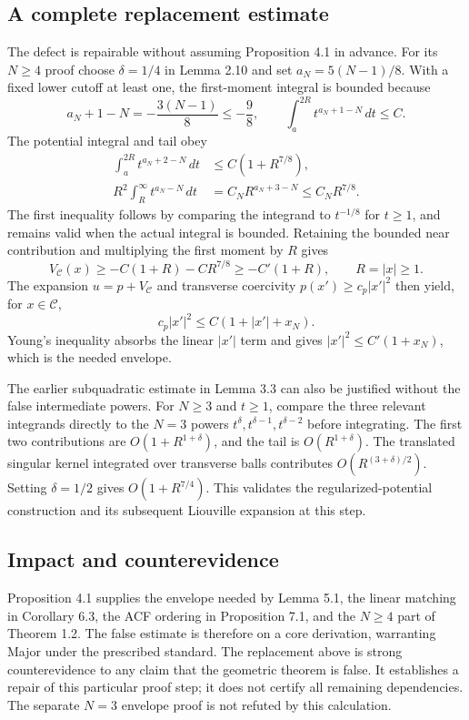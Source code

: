 \documentclass[10pt]{article}
\begin{document}
\subsection*{A complete replacement estimate}
The defect is repairable without assuming Proposition 4.1 in advance. For its \(N\geq4\) proof choose \(\delta=1/4\) in Lemma 2.10 and set \(a_N=5(N-1)/8\). With a fixed lower cutoff at least one, the first-moment integral is bounded because \[a_N+1-N=-\frac{3(N-1)}8\leq-\frac98,\qquad
\int_a^{2R}t^{a_N+1-N}\,dt\leq C.\] The potential integral and tail obey \[\begin{aligned}
\int_a^{2R}t^{a_N+2-N}\,dt
 &\leq C(1+R^{7/8}),\\
R^2\int_R^\infty t^{a_N-N}\,dt
 &= C_N R^{a_N+3-N}\leq C_N R^{7/8}.\end{aligned}\] The first inequality follows by comparing the integrand to \(t^{-1/8}\) for \(t\geq1\), and remains valid when the actual integral is bounded. Retaining the bounded near contribution and multiplying the first moment by \(R\) gives \[V_{\mathcal C}(x)\geq-C(1+R)-CR^{7/8}\geq-C'(1+R),
\qquad R=|x|\geq1.\] The expansion \(u=p+V_{\mathcal C}\) and transverse coercivity \(p(x')\geq c_p|x'|^2\) then yield, for \(x\in\mathcal C\), \[c_p|x'|^2\leq C(1+|x'|+x_N).\] Young’s inequality absorbs the linear \(|x'|\) term and gives \(|x'|^2\leq C'(1+x_N)\), which is the needed envelope.\par
The earlier subquadratic estimate in Lemma 3.3 can also be justified without the false intermediate powers. For \(N\geq3\) and \(t\geq1\), compare the three relevant integrands directly to the \(N=3\) powers \(t^\delta,t^{\delta-1},t^{\delta-2}\) before integrating. The first two contributions are \(O(1+R^{1+\delta})\), and the tail is \(O(R^{1+\delta})\). The translated singular kernel integrated over transverse balls contributes \(O(R^{(3+\delta)/2})\). Setting \(\delta=1/2\) gives \(O(1+R^{7/4})\). This validates the regularized-potential construction and its subsequent Liouville expansion at this step.\par
\subsection*{Impact and counterevidence}
Proposition 4.1 supplies the envelope needed by Lemma 5.1, the linear matching in Corollary 6.3, the ACF ordering in Proposition 7.1, and the \(N\geq4\) part of Theorem 1.2. The false estimate is therefore on a core derivation, warranting Major under the prescribed standard. The replacement above is strong counterevidence to any claim that the geometric theorem is false. It establishes a repair of this particular proof step; it does not certify all remaining dependencies. The separate \(N=3\) envelope proof is not refuted by this calculation.\par
\end{document}
